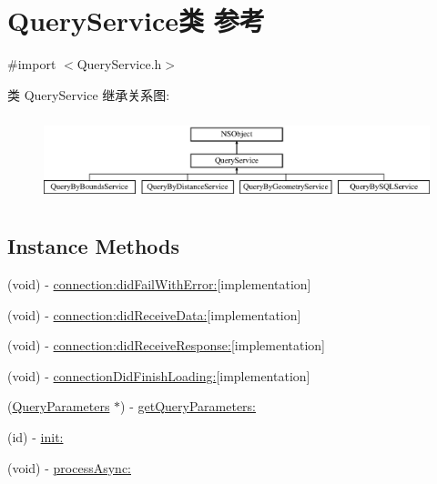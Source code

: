 \hypertarget{interface_query_service}{\section{Query\-Service类 参考}
\label{interface_query_service}
}


{\ttfamily \#import $<$Query\-Service.\-h$>$}

类 Query\-Service 继承关系图\-:\begin{figure}[H]
\begin{center}
\leavevmode
\includegraphics[height=2.485207cm]{interface_query_service}
\end{center}
\end{figure}
\subsection*{Instance Methods}
\begin{DoxyCompactItemize}
\item 
(void) -\/ \hyperlink{interface_query_service_a98be7666a9ed5ec6083aee4d72ebc855}{connection\-:did\-Fail\-With\-Error\-:}{\ttfamily  \mbox{[}implementation\mbox{]}}
\item 
(void) -\/ \hyperlink{interface_query_service_a74a40e3c8270e08c175c36f97da4ff2c}{connection\-:did\-Receive\-Data\-:}{\ttfamily  \mbox{[}implementation\mbox{]}}
\item 
(void) -\/ \hyperlink{interface_query_service_ad458e3790d8616a6b0e0d94b378549b0}{connection\-:did\-Receive\-Response\-:}{\ttfamily  \mbox{[}implementation\mbox{]}}
\item 
(void) -\/ \hyperlink{interface_query_service_a817956092252af96bfd27c6fcbc8cf4f}{connection\-Did\-Finish\-Loading\-:}{\ttfamily  \mbox{[}implementation\mbox{]}}
\item 
(\hyperlink{interface_query_parameters}{Query\-Parameters} $\ast$) -\/ \hyperlink{interface_query_service_abeb01f02ddfd9320d881c29b839999a8}{get\-Query\-Parameters\-:}
\item 
(id) -\/ \hyperlink{interface_query_service_a7a0a3055ea245b0602a3604bb2db3094}{init\-:}
\item 
(void) -\/ \hyperlink{interface_query_service_a80a886ec8e3d38d5f35de003220292d3}{process\-Async\-:}
\end{DoxyCompactItemize}
